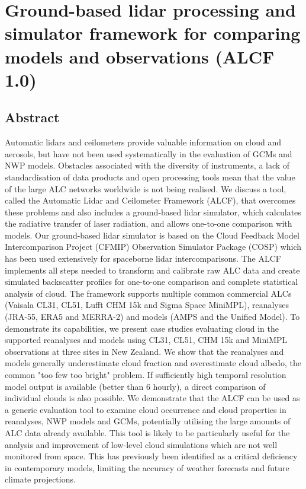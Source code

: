 \chapter{Ground-based lidar processing and simulator framework for comparing models and observations (ALCF 1.0)}

\section*{Abstract}

Automatic lidars and ceilometers provide valuable information on cloud and aerosols, but have not been used systematically in the evaluation of GCMs and NWP models. Obstacles associated with the diversity of instruments, a lack of standardisation of data products and open processing tools mean that the value of the large ALC networks worldwide is not being realised. We discuss a tool, called the
Automatic Lidar and Ceilometer Framework (ALCF), that overcomes these problems and also includes a ground-based lidar simulator, which calculates the radiative transfer of laser radiation, and allows one-to-one comparison with models. Our ground-based lidar simulator is based on the Cloud Feedback Model Intercomparison
Project (CFMIP) Observation Simulator Package (COSP) which has been used extensively for spaceborne lidar intercomparisons. The ALCF
implements all steps needed to transform  and calibrate raw ALC data and create  simulated 
backscatter profiles for one-to-one comparison and complete statistical analysis of cloud. The framework supports multiple common
commercial ALCs (Vaisala CL31, CL51, Lufft CHM 15k and Sigma Space MiniMPL), reanalyses (JRA-55,
ERA5 and MERRA-2) and models (AMPS and the Unified Model). To demonstrate its
capabilities, we present case studies evaluating cloud in the
supported reanalyses and models using CL31, CL51, CHM 15k and MiniMPL
observations at three sites in New Zealand. We show that the reanalyses
and models generally underestimate cloud fraction and overestimate cloud albedo,
the common "too few too bright" problem.
If sufficiently high temporal resolution model output is available (better than 6 hourly), a direct comparison of
individual clouds is also possible. We demonstrate that the ALCF can be used as a generic
evaluation tool to examine cloud occurrence and cloud properties in reanalyses, NWP models and GCMs, potentially utilising the large amounts of ALC data already available. This tool  is likely to be  particularly useful for the analysis and improvement of low-level cloud simulations which are not well monitored from space. This has previously been identified as a critical deficiency in contemporary models, limiting the accuracy of weather forecasts and future climate projections.

